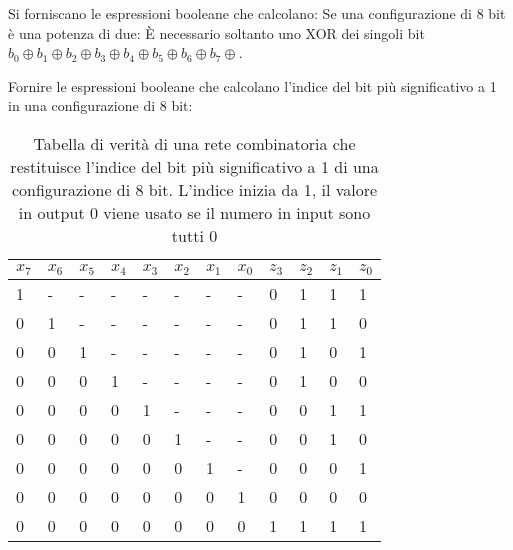\begin{exrc}
	Si forniscano le espressioni booleane che calcolano:
	Se una configurazione di 8 bit è una potenza di due: È necessario soltanto uno XOR dei singoli bit $ b_0 \oplus b_1 \oplus b_2 \oplus b_3 \oplus b_4 \oplus b_5 \oplus b_6 \oplus b_7 \oplus $.
	
	Fornire le espressioni booleane che calcolano l'indice del bit più significativo a 1 in una configurazione di 8 bit: 
	\begin{table}[H]
		\centering
		\caption{Tabella di verità di una rete combinatoria che restituisce l'indice del bit più significativo a 1 di una configurazione di 8 bit. L'indice inizia da 1, il valore in output 0 viene usato se il numero in input sono tutti 0}
		\label{tab:homework1}
		\begin{tabular}{|llllllll|llll|}
			\hline
			$x_7$ & $x_6$ & $x_5$ & $x_4$ & $x_3$ & $x_2$ & $x_1$ & $x_0$ & $z_3$ & $z_2$ & $z_1$ & $z_0$ \\ \hline
			1     & -     & -     & -     & -     & -     & -     & -     & 0     & 1     & 1     & 1     \\ \hline
			0     & 1     & -     & -     & -     & -     & -     & -     & 0     & 1     & 1     & 0     \\ \hline
			0     & 0     & 1     & -     & -     & -     & -     & -     & 0     & 1     & 0     & 1     \\ \hline
			0     & 0     & 0     & 1     & -     & -     & -     & -     & 0     & 1     & 0     & 0     \\ \hline
			0     & 0     & 0     & 0     & 1     & -     & -     & -     & 0     & 0     & 1     & 1     \\ \hline
			0     & 0     & 0     & 0     & 0     & 1     & -     & -     & 0     & 0     & 1     & 0     \\ \hline
			0     & 0     & 0     & 0     & 0     & 0     & 1     & -     & 0     & 0     & 0     & 1     \\ \hline
			0     & 0     & 0     & 0     & 0     & 0     & 0     & 1     & 0     & 0     & 0     & 0     \\ \hline
			0     & 0     & 0     & 0     & 0     & 0     & 0     & 0     & 1     & 1     & 1     & 1     \\ \hline
		\end{tabular}
	\end{table}


\end{exrc}
